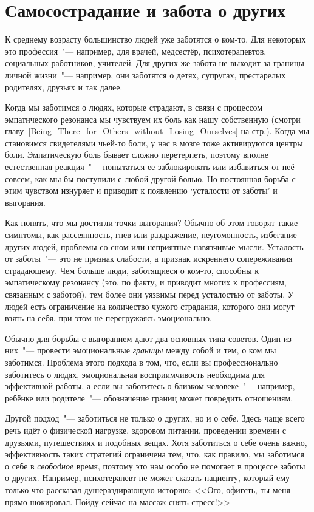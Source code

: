 
\chapter{Самосострадание и забота о других} \label{Self-Compassion_for_Caregivers}

К среднему возрасту большинство людей уже заботятся о ком-то. Для некоторых это профессия~"--- например, для врачей, медсестёр, психотерапевтов, социальных работников, учителей. Для других же забота не выходит за границы личной жизни~"--- например, они заботятся о детях, супругах, престарелых родителях, друзьях и так далее.

Когда мы заботимся о людях, которые страдают, в связи с процессом эмпатического резонанса мы чувствуем их боль как нашу собственную (смотри главу~\ref{Being_There_for_Others_without_Losing_Ourselves} на стр.\:\pageref{Being_There_for_Others_without_Losing_Ourselves}). Когда мы становимся свидетелями чьей-то боли, у нас в мозге тоже активируются центры боли. Эмпатическую боль бывает сложно перетерпеть, поэтому вполне естественная реакция~"--- попытаться ее заблокировать или избавиться от неё совсем, как мы бы поступили с любой другой болью. Но постоянная борьба с этим чувством изнуряет и приводит к появлению ‘усталости от заботы’ и выгорания.

Как понять, что мы достигли точки выгорания? Обычно об этом говорят такие симптомы, как рассеянность, гнев или раздражение, неугомонность, избегание других людей, проблемы со сном или неприятные навязчивые мысли. Усталость от заботы~"--- это не признак слабости, а признак искреннего сопереживания страдающему. Чем больше люди, заботящиеся о ком-то, способны к эмпатическому резонансу (это, по факту, и приводит многих к профессиям, связанным с заботой), тем более они уязвимы перед усталостью от заботы. У людей есть ограничение на количество чужого страдания, которого они могут взять на себя, при этом не перегружаясь эмоционально.

Обычно для борьбы с выгоранием дают два основных типа советов. Один из них~"--- провести эмоциональные \emph{границы} между собой и тем, о ком мы заботимся. Проблема этого подхода в том, что, если вы профессионально заботитесь о людях, эмоциональная восприимчивость необходима для эффективной работы, а если вы заботитесь о близком человеке~"--- например, ребёнке или родителе~"--- обозначение границ может повредить отношениям. 

Другой подход~"--- заботиться не только о других, но и о \emph{себе}. Здесь чаще всего речь идёт о физической нагрузке, здоровом питании, проведении времени с друзьями, путешествиях и подобных вещах. Хотя заботиться о себе очень важно, эффективность таких стратегий ограничена тем, что, как правило, мы заботимся о себе в \emph{свободное} время, поэтому это нам особо не помогает в процессе заботы о других. Например,  психотерапевт не может сказать пациенту, который ему только что рассказал душераздирающую историю: <<Ого, офигеть, ты меня прямо шокировал. Пойду сейчас на массаж снять стресс!>>


